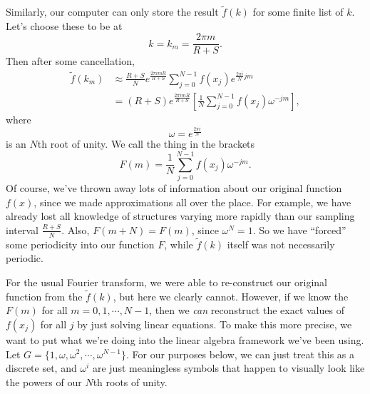 \documentclass[a4paper]{article}
\begin{document}
Similarly, our computer can only store the result $\tilde{f}(k)$ for some finite list of $k$. Let's choose these to be at
\[
  k = k_m = \frac{2\pi m}{R + S}.
\]
Then after some cancellation,
\begin{align*}
  \tilde{f}(k_m) &\approx \frac{R + S}{N} e^{\frac{2\pi i m R}{R + S}} \sum_{j = 0}^{N - 1} f(x_j) e^{\frac{2\pi i}{N} jm}\\
  &= (R + S) e^{\frac{2\pi i m R}{R + S}} \left[\frac{1}{N} \sum_{j = 0}^{N - 1} f(x_j) \omega^{-jm}\right],
\end{align*}
where
\[
  \omega = e^{\frac{2\pi i}{N}}
\]
is an $N$th root of unity. We call the thing in the brackets
\[
  F(m) = \frac{1}{N} \sum_{j = 0}^{N - 1} f(x_j) \omega^{-jm}.
\]
Of course, we've thrown away lots of information about our original function $f(x)$, since we made approximations all over the place. For example, we have already lost all knowledge of structures varying more rapidly than our sampling interval $\frac{R + S}{N}$. Also, $F(m + N) = F(m)$, since $\omega^N = 1$. So we have ``forced'' some periodicity into our function $F$, while $\tilde{f}(k)$ itself was not necessarily periodic.

For the usual Fourier transform, we were able to re-construct our original function from the $\tilde{f}(k)$, but here we clearly cannot. However, if we know the $F(m)$ for all $m = 0, 1, \cdots, N - 1$, then we \emph{can} reconstruct the exact values of $f(x_j)$ for all $j$ by just solving linear equations. To make this more precise, we want to put what we're doing into the linear algebra framework we've been using. Let $G = \{1, \omega, \omega^2, \cdots, \omega^{N - 1}\}$. For our purposes below, we can just treat this as a discrete set, and $\omega^i$ are just meaningless symbols that happen to visually look like the powers of our $N$th roots of unity.
\end{document}
